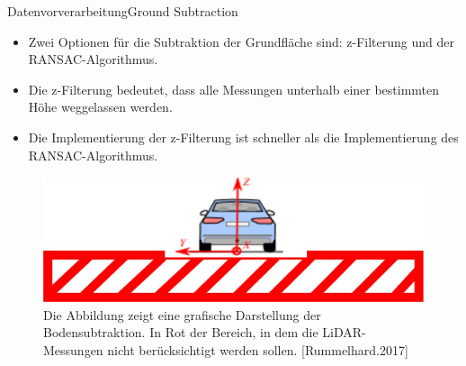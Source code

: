 \documentclass[169, handout	]{THIbeamer} %
\begin{document}
	\begin{frame}{Datenvorverarbeitung}{Ground Subtraction}
		\begin{itemize}
			\item Zwei Optionen für die Subtraktion der Grundfläche sind: z-Filterung und der RANSAC-Algorithmus.
			\item Die z-Filterung bedeutet, dass alle Messungen unterhalb einer bestimmten Höhe weggelassen werden.
			\item Die Implementierung der z-Filterung ist schneller als die Implementierung des RANSAC-Algorithmus.
		\end{itemize}
		\begin{figure}
			\includegraphics[scale=0.5]{required/Ground Subtraction Implementierung.jpg} 
			\caption{Die Abbildung zeigt eine grafische Darstellung der Bodensubtraktion. In Rot der Bereich, in dem die LiDAR-Messungen nicht berücksichtigt werden sollen. [Rummelhard.2017]}
		\end{figure}
	\end{frame}
\end{document}
